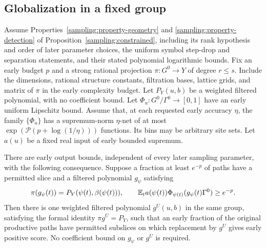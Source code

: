 \subsection{Globalization in a fixed group}

\begin{proposition}
\label{lifting:candidate-globalization}
Assume Properties~\ref{sampling:property-geometry} and
\ref{sampling:property-detection} of Proposition~\ref{sampling:constrained},
including its rank hypothesis and order of later parameter choices,
the uniform symbol step-drop and separation statements, and their
stated polynomial logarithmic bounds.  Fix an early budget $p$ and
a strong rational projection $\pi:G^0\to Y$ of degree $r\le s$.
Include the dimensions, rational structure constants, filtration
bases, lattice grids, and matrix of $\pi$ in the early complexity
budget.  Let $P_Y(u,b)$ be a weighted filtered polynomial, with no
coefficient bound.  Let $\Phi_u:G^0/\Gamma^0\to[0,1]$ have an
early uniform Lipschitz bound.  Assume that, at each requested early
accuracy $\eta$, the family $\{\Phi_u\}$ has a supremum-norm
$\eta$-net of at most $\exp(\mathcal P(p+\log(1/\eta)))$ functions.
Its bins may be arbitrary site sets.  Let $a(u)$ be a fixed real
input of early bounded supremum.

There are early output bounds, independent of every later sampling
parameter, with the following consequence.  Suppose a fraction at
least $e^{-p}$ of paths have a permitted slice and a filtered
polynomial $g_\psi$ satisfying
\[
 \pi(g_\psi(t))=P_Y(\psi(t),\beta(\psi(t))),\qquad
 \mathbb E_t a(\psi(t))\Phi_{\psi(t)}(g_\psi(t)\Gamma^0)\ge e^{-p}.
\]
Then there is one weighted filtered polynomial $g^U(u,b)$ in the
same group, satisfying the formal identity $\pi g^U=P_Y$, such that
an early fraction of the original productive paths have permitted
subslices on which replacement by $g^U$ gives early positive score.
No coefficient bound on $g_\psi$ or $g^U$ is required.
\end{proposition}

